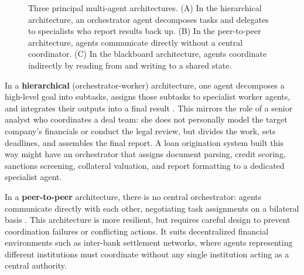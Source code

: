 \documentclass{article}
\begin{document}
\begin{figure}[h!]
\caption{Three principal multi-agent architectures. (A) In the hierarchical architecture, an orchestrator agent decomposes tasks and delegates to specialists who report results back up. (B) In the peer-to-peer architecture, agents communicate directly without a central coordinator. (C) In the blackboard architecture, agents coordinate indirectly by reading from and writing to a shared state.}
\label{fig:mas-architectures}
\end{figure}

In a \textbf{hierarchical} (orchestrator-worker) architecture, one agent decomposes a high-level goal into subtasks, assigns those subtasks to specialist worker agents, and integrates their outputs into a final result \cite{guo2024large}. This mirrors the role of a senior analyst who coordinates a deal team: she does not personally model the target company's financials or conduct the legal review, but divides the work, sets deadlines, and assembles the final report. A loan origination system built this way might have an orchestrator that assigns document parsing, credit scoring, sanctions screening, collateral valuation, and report formatting to a dedicated specialist agent.

In a \textbf{peer-to-peer} architecture, there is no central orchestrator: agents communicate directly with each other, negotiating task assignments on a bilateral basis \cite{wooldridge2009introduction}. This architecture is more resilient, but requires careful design to prevent coordination failures or conflicting actions. It suits decentralized financial environments such as inter-bank settlement networks, where agents representing different institutions must coordinate without any single institution acting as a central authority.
\end{document}
